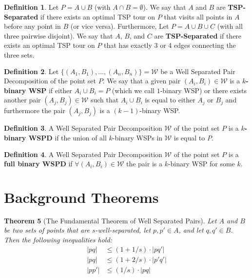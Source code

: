 \documentclass{article}
\newcommand{\PairDecomp}{\mathcal{W}}
\newtheorem{thm}{Theorem}[section]
\theoremstyle{definition}
\newtheorem{defn}[thm]{Definition}
\begin{document}
\begin{defn}
    Let $P = A \cup B$ (with $A \cap B = \emptyset$). We say that $A$ and $B$ are \textbf{TSP-Separated} if there exists an optimal TSP tour on $P$ that visits all points in $A$ before any point in $B$ (or vice versa). 
    Furthermore, Let $P = A \cup B \cup C$ (with all three pairwise disjoint). We say that $A$, $B$, and $C$ are \textbf{TSP-Separated} if 
    there exists an optimal TSP tour on $P$ that has exactly 3 or 4 edges connecting the three sets. 
\end{defn}

\begin{defn}
    Let $\{(A_1, B_1), \dots, (A_n, B_n)\} = \PairDecomp$ be a Well Separated Pair Decomposition of the point set $P$.
    We say that a given pair $(A_i, B_i) \in \PairDecomp$ is a \textbf{$k$-binary WSP} if either $A_i \cup B_i = P$ (which we call $1$-binary WSP) or there exists another pair $(A_j, B_j) \in \PairDecomp$ such that $A_i \cup B_i$ is equal to either $A_j$ or $B_j$ and furthermore the pair $(A_j, B_j)$ is a $(k-1)$-binary WSP.
\end{defn}

\begin{defn}
    A Well Separated Pair Decomposition $\PairDecomp$ of the point set $P$ is a \textbf{$k$-binary WSPD} if the union of all $k$-binary WSPs in $\PairDecomp$ is equal to $P$.
\end{defn}

\begin{defn}
    A Well Separated Pair Decomposition $\PairDecomp$ of the point set $P$ is a \textbf{full binary WSPD} if $\forall (A_i, B_i) \in \PairDecomp$ the pair is a $k$-binary WSP for some $k$.
\end{defn}

\section{Background Theorems}
\begin{thm}[The Fundamental Theorem of Well Separated Pairs]\label{thm:fundamental_thm_wsp}
Let $A$ and $B$ be two sets of points that are $s$-well-separated, let $p,p' \in A$, and let $q,q' \in B$. 
Then the following inequalities hold:
\begin{align*}
    |pq| &\leq (1 + 1/s) \cdot |pq'| \\
    |pq| &\leq (1 + 2/s) \cdot |p'q'| \\
    |pp'| &\leq (1/s) \cdot |pq| \\
\end{align*}
\end{thm}
\end{document}
